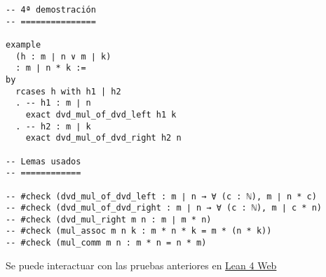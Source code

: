 \begin{verbatim}
-- 4ª demostración
-- ===============

example
  (h : m ∣ n ∨ m ∣ k)
  : m ∣ n * k :=
by
  rcases h with h1 | h2
  . -- h1 : m ∣ n
    exact dvd_mul_of_dvd_left h1 k
  . -- h2 : m ∣ k
    exact dvd_mul_of_dvd_right h2 n

-- Lemas usados
-- ============

-- #check (dvd_mul_of_dvd_left : m ∣ n → ∀ (c : ℕ), m ∣ n * c)
-- #check (dvd_mul_of_dvd_right : m ∣ n → ∀ (c : ℕ), m ∣ c * n)
-- #check (dvd_mul_right m n : m ∣ m * n)
-- #check (mul_assoc m n k : m * n * k = m * (n * k))
-- #check (mul_comm m n : m * n = n * m)
\end{verbatim}
Se puede interactuar con las pruebas anteriores en \href{https://lean.math.hhu.de/\#url=https://raw.githubusercontent.com/jaalonso/Calculemus2/main/src/CS\_de\_divisibilidad\_del\_producto.lean.lean}{Lean 4 Web}

